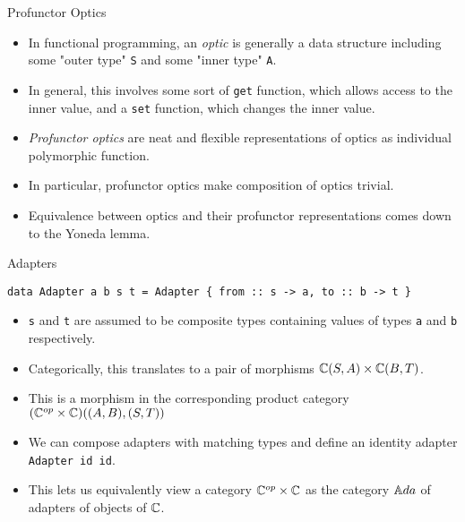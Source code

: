 \begin{frame}[fragile]{Profunctor Optics}
	\begin{itemize}
		\item In functional programming, an \textit{optic} is generally a data structure including some "outer type" \texttt{S} and some "inner type" \texttt{A}.
		\pause\item In general, this involves some sort of \texttt{get} function, which allows access to the inner value, and a \texttt{set} function, which changes the inner value.
		\pause\item \textit{Profunctor optics} are neat and flexible representations of optics as individual polymorphic function.
		\pause\item In particular, profunctor optics make composition of optics trivial.
		\pause\item Equivalence between optics and their profunctor representations comes down to the Yoneda lemma.
	\end{itemize}
\end{frame}
\begin{frame}[fragile]{Adapters}
	\begin{lstlisting}
data Adapter a b s t = Adapter { from :: s -> a, to :: b -> t }
	\end{lstlisting}
	\begin{itemize}
		\item \texttt{s} and \texttt{t} are assumed to be composite types containing values of types \texttt{a} and \texttt{b} respectively.
		\pause\item Categorically, this translates to a pair of morphisms $\mathbb{C}(S,A) \times \mathbb{C}(B,T)$. 
		\pause\item This is a morphism in the corresponding product category $(\mathbb{C}^{op} \times \mathbb{C})((A,B), (S,T))$
		\pause\item We can compose adapters with matching types and define an identity adapter \texttt{Adapter id id}.
		\pause\item This lets us equivalently view a category $\mathbb{C}^{op} \times \mathbb{C}$ as the category ${\mathbb{A}da}$ of adapters of objects of $\mathbb{C}$.
	\end{itemize}
\end{frame}
